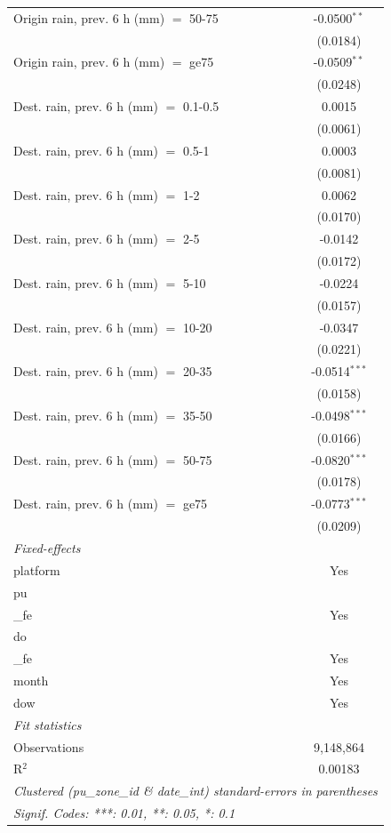 \begin{tabular}{lc}
   Origin rain, prev. 6 h (mm) $=$ 50-75 & -0.0500$^{**}$\\
    & (0.0184)\\
   Origin rain, prev. 6 h (mm) $=$ ge75 & -0.0509$^{**}$\\
    & (0.0248)\\
   Dest. rain, prev. 6 h (mm) $=$ 0.1-0.5 & 0.0015\\
    & (0.0061)\\
   Dest. rain, prev. 6 h (mm) $=$ 0.5-1 & 0.0003\\
    & (0.0081)\\
   Dest. rain, prev. 6 h (mm) $=$ 1-2 & 0.0062\\
    & (0.0170)\\
   Dest. rain, prev. 6 h (mm) $=$ 2-5 & -0.0142\\
    & (0.0172)\\
   Dest. rain, prev. 6 h (mm) $=$ 5-10 & -0.0224\\
    & (0.0157)\\
   Dest. rain, prev. 6 h (mm) $=$ 10-20 & -0.0347\\
    & (0.0221)\\
   Dest. rain, prev. 6 h (mm) $=$ 20-35 & -0.0514$^{***}$\\
    & (0.0158)\\
   Dest. rain, prev. 6 h (mm) $=$ 35-50 & -0.0498$^{***}$\\
    & (0.0166)\\
   Dest. rain, prev. 6 h (mm) $=$ 50-75 & -0.0820$^{***}$\\
    & (0.0178)\\
   Dest. rain, prev. 6 h (mm) $=$ ge75 & -0.0773$^{***}$\\
    & (0.0209)\\
   \midrule
   \emph{Fixed-effects}\\
   platform & Yes\\
   pu\\_fe & Yes\\
   do\\_fe & Yes\\
   month & Yes\\
   dow & Yes\\
   \midrule
   \emph{Fit statistics}\\
   Observations & 9,148,864\\
   R$^2$ & 0.00183\\
   \midrule \midrule
   \multicolumn{2}{l}{\emph{Clustered (pu\_zone\_id \& date\_int) standard-errors in parentheses}}\\
   \multicolumn{2}{l}{\emph{Signif. Codes: ***: 0.01, **: 0.05, *: 0.1}}\\
\end{tabular}
 
